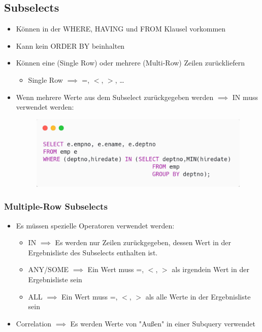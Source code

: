 \subsection{Subselects}
\begin{itemize}
    \item Können in der WHERE, HAVING und FROM Klausel vorkommen
    \item Kann kein ORDER BY beinhalten
    \item Können eine (Single Row) oder mehrere (Multi-Row) Zeilen zurückliefern
    \begin{itemize}
        \item Single Row $\implies$ =, $<$, $>$, \dots
    \end{itemize}
    \item Wenn mehrere Werte aus dem Subselect zurückgegeben werden $\implies$ IN muss verwendet werden:
    \begin{figure}[H]
        \centering
        \includegraphics[scale=.4]{res/themenkorb_2/subselect_multiple.png} 
    \end{figure}
\end{itemize}

\subsubsection{Multiple-Row Subselects}
\begin{itemize}
    \item Es müssen spezielle Operatoren verwendet werden:
    \begin{itemize}
        \item IN $\implies$ Es werden nur Zeilen zurückgegeben, dessen Wert in der Ergebnisliste des Subselects enthalten ist.
        \item ANY/SOME $\implies$ Ein Wert muss =, $<$, $>$ als irgendein Wert in der Ergebnisliste sein
        \item ALL $\implies$ Ein Wert muss =, $<$, $>$ als alle Werte in der Ergebnisliste sein
    \end{itemize}
    \item Correlation $\implies$ Es werden Werte von "Außen" in einer Subquery verwendet
\end{itemize}

